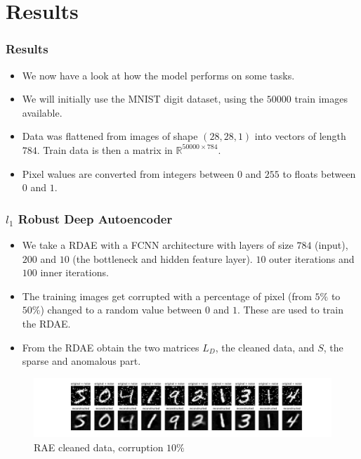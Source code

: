 \documentclass{beamer}
\theoremstyle{plain}
\theoremstyle{definition}
\theoremstyle{remark}
\newcommand{\R}{\mathbb{R}}
\begin{document}
\section{Results}

\begin{frame}
	\frametitle{Results}
	\begin{itemize}
        \item We now have a look at how the model performs on some tasks.
		\item We will initially use the MNIST digit dataset, using the $50000$ train images available.
		\item Data was flattened from images of shape $(28,28,1)$ into vectors of length $784$. Train data is then a matrix in $\R^{50000\times 784}$.
		\item Pixel walues are converted from integers between $0$ and $255$ to floats between $0$ and $1$.
	\end{itemize}
\end{frame}

\begin{frame}
	\frametitle{$l_1$ Robust Deep Autoencoder}
	\begin{itemize}
		\item We take a RDAE with a FCNN architecture with layers of size $784$ (input), $200$ and $10$ (the bottleneck and hidden feature layer). $10$ outer iterations and $100$ inner iterations.
		\item The training images get corrupted with a percentage of pixel (from $5\%$ to $50\%$) changed to a random value between $0$ and $1$. These are used to train the RDAE.
		\item From the RDAE obtain the two matrices $L_D$, the cleaned data, and $S$, the sparse and anomalous part.
	\end{itemize}
\end{frame}

\begin{frame}
	\begin{figure}
		\centering
		\includegraphics[width=0.95\linewidth]{Images/lam20.0corr0.1/RAE_recon.png}
		\caption[]{RAE cleaned data, corruption $10\%$}
	\end{figure}
\end{frame}
\end{document}
